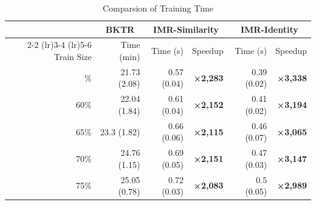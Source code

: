 \begin{table}[t]
\caption*{
{\fontsize{20}{25}\selectfont  Comparsion of Training Time\fontsize{12}{15}\selectfont }
}
\fontsize{12.0pt}{14.0pt}\selectfont
\begin{tabular*}{\linewidth}{@{\extracolsep{\fill}}rrrrrr}
\toprule
 & \multicolumn{1}{c}{{\bfseries BKTR}} & \multicolumn{2}{c}{{\bfseries IMR-Similarity}} & \multicolumn{2}{c}{{\bfseries IMR-Identity}} \\
\cmidrule(lr){2-2} \cmidrule(lr){3-4} \cmidrule(lr){5-6}
Train Size & Time (min) & Time (s) & Speedup & Time (s) & Speedup \\
\midrule\addlinespace[2.5pt]
55\% & 21.73 (2.08) & 0.57 (0.04) & {\bfseries \textcolor[HTML]{2F4F4F}{×2,283}} & 0.39 (0.02) & {\bfseries \textcolor[HTML]{2F4F4F}{×3,338}} \\
60\% & 22.04 (1.84) & 0.61 (0.04) & {\bfseries \textcolor[HTML]{2F4F4F}{×2,152}} & 0.41 (0.02) & {\bfseries \textcolor[HTML]{2F4F4F}{×3,194}} \\
65\% & 23.3 (1.82) & 0.66 (0.06) & {\bfseries \textcolor[HTML]{2F4F4F}{×2,115}} & 0.46 (0.07) & {\bfseries \textcolor[HTML]{2F4F4F}{×3,065}} \\
70\% & 24.76 (1.15) & 0.69 (0.05) & {\bfseries \textcolor[HTML]{2F4F4F}{×2,151}} & 0.47 (0.03) & {\bfseries \textcolor[HTML]{2F4F4F}{×3,147}} \\
75\% & 25.05 (0.78) & 0.72 (0.03) & {\bfseries \textcolor[HTML]{2F4F4F}{×2,083}} & 0.5 (0.05) & {\bfseries \textcolor[HTML]{2F4F4F}{×2,989}} \\
\bottomrule
\end{tabular*}
\end{table}

